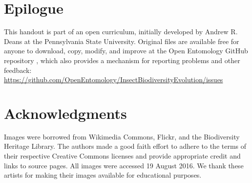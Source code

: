 \documentclass[letterpaper, 11pt]{article}
\begin{document}
\section*{Epilogue}
This handout is part of an open curriculum, initially developed by Andrew R. Deans at the Pennsylvania State University. Original files are available free for anyone to download, copy, modify, and improve at the Open Entomology GitHub repository \citep{ENT532}, which also provides a mechanism for reporting problems and other feedback:\\
\url{https://github.com/OpenEntomology/InsectBiodiversityEvolution/issues}

\section*{Acknowledgments}
Images were borrowed from Wikimedia Commons, Flickr, and the Biodiversity Heritage Library. The authors made a good faith effort to adhere to the terms of their respective Creative Commons licenses and provide appropriate credit and links to source pages. All images were accessed 19 August 2016. We thank these artists for making their images available for educational purposes.

\FloatBarrier


\end{document}
